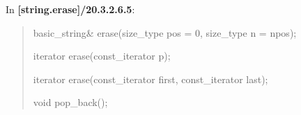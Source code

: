 \documentclass{wg21}
\begin{document}
In \textbf{[string.erase]/20.3.2.6.5}:
\begin{quote}
\begin{itemdecl}
basic_string& erase(size_type pos = 0, size_type n = npos);
\end{itemdecl}

\begin{itemdecl}
iterator erase(const_iterator p);
\end{itemdecl}

\begin{itemdecl}
iterator erase(const_iterator first, const_iterator last);
\end{itemdecl}

\begin{itemdecl}
void pop_back();
\end{itemdecl}
\end{quote}
\end{document}
